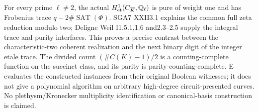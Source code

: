 For every prime $\ell\ne2$, the actual $H^1_{\rm et}(C_{\overline K},\mathbb Q_\ell)$ is pure of weight one and has Frobenius trace $q-2\#\operatorname{SAT}(\Phi)$. SGA7 XXII3.1 explains the common full zeta reduction modulo two; Deligne Weil I1.5.1,1.6 and2.3--2.5 supply the integral trace and purity interfaces. This proves a precise contrast between the characteristic-two coherent realization and the next binary digit of the integer etale trace. The divided count $(\#C(K)-1)/2$ is a counting-complete function on the succinct class, and its parity is parity-counting-complete. E evaluates the constructed instances from their original Boolean witnesses; it does not give a polynomial algorithm on arbitrary high-degree circuit-presented curves. No plethysm/Kronecker multiplicity identification or canonical-basis construction is claimed.



